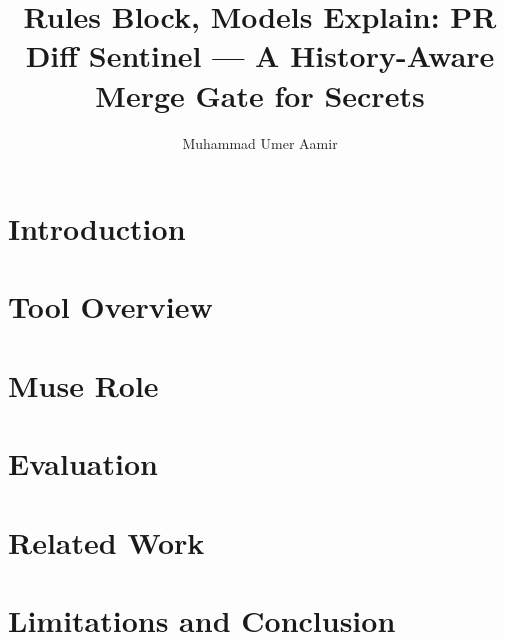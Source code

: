 \documentclass[sigconf]{acmart}
\title{Rules Block, Models Explain: PR Diff Sentinel --- A History-Aware Merge Gate for Secrets}
\author{Muhammad Umer Aamir}
\affiliation{%
  \institution{Wilfrid Laurier University}
  \city{Brantford}
  \country{Canada}
}
\begin{document}
\maketitle

\section{Introduction}

\section{Tool Overview}

\section{Muse Role}

\section{Evaluation}

\section{Related Work}

\section{Limitations and Conclusion}



\end{document}
